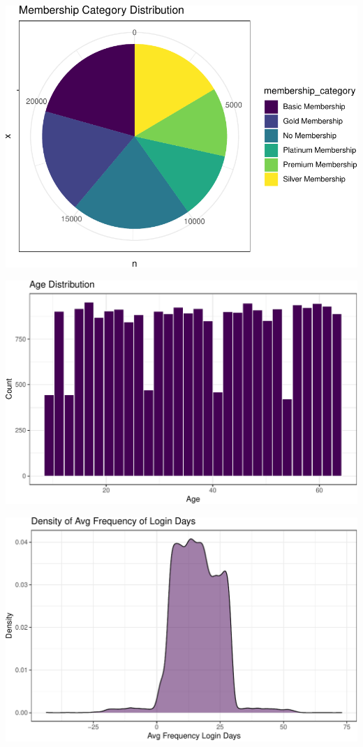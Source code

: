 \documentclass[
  letterpaper,
  DIV=11,
  numbers=noendperiod]{scrartcl}
\begin{document}
\begin{center}
\includegraphics{FPCP4_files/figure-pdf/unnamed-chunk-21-1.pdf}
\end{center}

\begin{center}
\includegraphics{FPCP4_files/figure-pdf/unnamed-chunk-22-1.pdf}
\end{center}

\begin{center}
\includegraphics{FPCP4_files/figure-pdf/unnamed-chunk-23-1.pdf}
\end{center}
\end{document}
